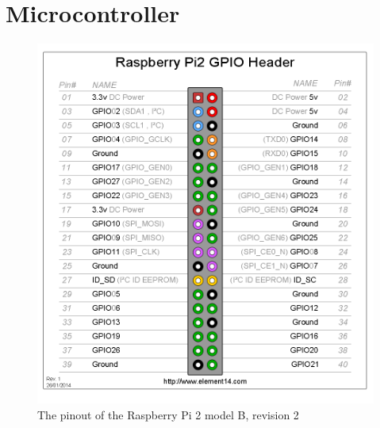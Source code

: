 \section{Microcontroller}



\begin{figure}[H]
	\centering
	\includegraphics[scale=.4]{images/GPIO_Pi2.png}
	\caption{The pinout of the Raspberry Pi 2 model B, revision 2}
	\label{fig:gpioraspbi2}
\end{figure}

